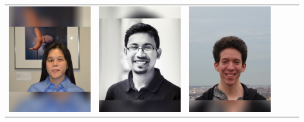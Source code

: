 \documentclass[landscape,a0paper,fontscale=0.292]{baposter}
\begin{document}
\begin{poster}
{\begin{center}
\begin{tabularx}{\linewidth}{X X X X X X}
{\centering \includegraphics[width=0.6\linewidth]{catliu.jpg}}&
{\centering \includegraphics[width=0.6\linewidth]{mrinal.jpg}}&
{\centering \includegraphics[width=0.6\linewidth]{teddy.jpg}}&

\end{tabularx}
\end{center}}
\end{poster}
\end{document}
